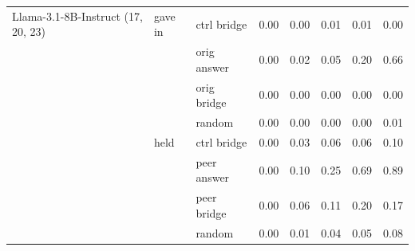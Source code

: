 \begin{tabular}{lllrrrrr}
\midrule
Llama-3.1-8B-Instruct (17, 20, 23) & gave in & ctrl bridge & 0.00 & 0.00 & 0.01 & 0.01 & 0.00 \\
 &  & orig answer & 0.00 & 0.02 & 0.05 & 0.20 & 0.66 \\
 &  & orig bridge & 0.00 & 0.00 & 0.00 & 0.00 & 0.00 \\
 &  & random & 0.00 & 0.00 & 0.00 & 0.00 & 0.01 \\
 & held & ctrl bridge & 0.00 & 0.03 & 0.06 & 0.06 & 0.10 \\
 &  & peer answer & 0.00 & 0.10 & 0.25 & 0.69 & 0.89 \\
 &  & peer bridge & 0.00 & 0.06 & 0.11 & 0.20 & 0.17 \\
 &  & random & 0.00 & 0.01 & 0.04 & 0.05 & 0.08 \\
\bottomrule
\end{tabular}
